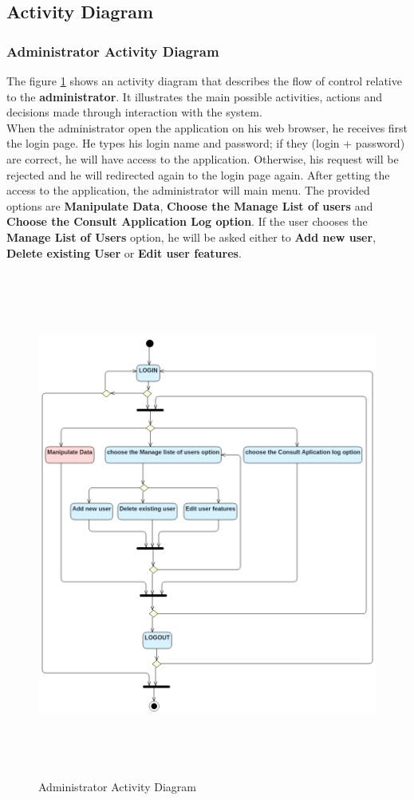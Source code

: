 \subsection{Activity Diagram}
\subsubsection{Administrator Activity Diagram} 
The figure \ref{act1} shows an activity diagram that describes the flow of control relative to the \textbf{administrator}. It illustrates the main possible activities, actions and decisions made through interaction with the system.\\
  
When the administrator open the application on his web browser, he receives first the login page. He types his login name and password; if they (login + password) are correct, he will have access to the application. Otherwise, his request will be rejected and he will redirected again to the login page again. After getting the access to the application, the administrator will main menu. The provided options are \textbf{Manipulate Data}, \textbf{Choose the Manage List of users} and \textbf{Choose the Consult Application Log option}. If the user chooses the \textbf{Manage List of Users} option, he will be asked either to \textbf{Add new user}, \textbf{Delete existing User} or \textbf{Edit user features}.


\begin{figure}[H]
\begin{center}
\includegraphics[width=17cm,height=16.7cm]{chapter3/administrator.png}
\end{center}
\caption{Administrator Activity Diagram}
\label{act1}
\end{figure}


